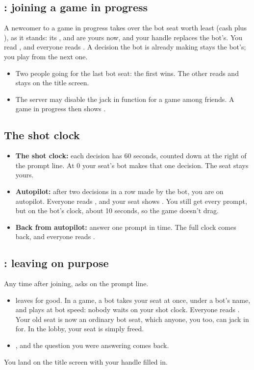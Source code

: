 \subsection{: joining a game in progress}
A newcomer to a game in progress takes over the bot seat worth least (cash plus ), as it stands: its
,  and  are yours now, and your handle replaces the bot's. You read
, and everyone reads . A decision the bot is already
making stays the bot's; you play from the next one.
\begin{itemize}
  \item Two people going for the last bot seat: the first \key{\KeyReturn} wins. The other reads
    \code{\TooLate} and stays on the title screen.
  \item The server may disable the jack in function for a game among friends. A game in progress then shows
    .
\end{itemize}

\subsection{The shot clock}
\begin{itemize}
  \item \textbf{The shot clock:} each decision has 60 seconds, counted down at the right of the prompt line. At 0
    your seat's bot makes that one decision. The seat stays yours.
  \item \textbf{Autopilot:} after two decisions in a row made by the bot, you are on autopilot. Everyone reads
    , and your seat shows . You still get every prompt, but on the bot's
    clock, about 10 seconds, so the game doesn't drag.
  \item \textbf{Back from autopilot:} answer one prompt in time. The full clock comes back, and everyone reads
    .
\end{itemize}

\subsection{: leaving on purpose}
Any time after joining, \key{\KeyEsc} asks \code{\LogOffAsk} on the prompt line.
\begin{itemize}
  \item \key{\KeyYes} leaves for good. In a game, a bot takes your seat at once, under a bot's name, and plays at bot
    speed: nobody waits on your shot clock. Everyone reads . Your old seat is now
    an ordinary bot seat, which anyone, you too, can jack in for. In the lobby, your seat is simply freed.
  \item \StayKeys, and the question you were answering comes back.
\end{itemize}
You land on the title screen with your handle filled in.

